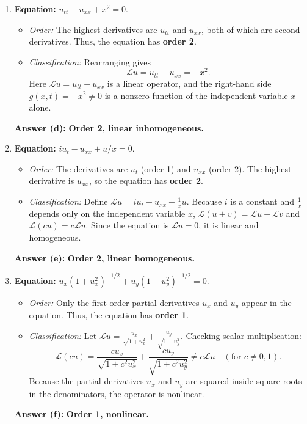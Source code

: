 \documentclass[11pt,a4paper]{article}
\begin{document}
\begin{enumerate}[label=(\alph*)]
    \item \textbf{Equation:} $u_{tt} - u_{xx} + x^2 = 0$.
    \begin{itemize}
        \item \emph{Order:} The highest derivatives are $u_{tt}$ and $u_{xx}$, both of which are second derivatives. Thus, the equation has \textbf{order 2}.
        \item \emph{Classification:} Rearranging gives
        \[
            \mathcal{L}u = u_{tt} - u_{xx} = -x^2.
        \]
        Here $\mathcal{L}u = u_{tt} - u_{xx}$ is a linear operator, and the right-hand side $g(x, t) = -x^2 \neq 0$ is a nonzero function of the independent variable $x$ alone.
    \end{itemize}
    \textbf{Answer (d):} \textbf{Order 2, linear inhomogeneous.}

    \item \textbf{Equation:} $i u_t - u_{xx} + u/x = 0$.
    \begin{itemize}
        \item \emph{Order:} The derivatives are $u_t$ (order 1) and $u_{xx}$ (order 2). The highest derivative is $u_{xx}$, so the equation has \textbf{order 2}.
        \item \emph{Classification:} Define $\mathcal{L}u = i u_t - u_{xx} + \frac{1}{x}u$. Because $i$ is a constant and $\frac{1}{x}$ depends only on the independent variable $x$, $\mathcal{L}(u+v) = \mathcal{L}u + \mathcal{L}v$ and $\mathcal{L}(cu) = c\mathcal{L}u$. Since the equation is $\mathcal{L}u = 0$, it is linear and homogeneous.
    \end{itemize}
    \textbf{Answer (e):} \textbf{Order 2, linear homogeneous.}

    \item \textbf{Equation:} $u_x(1 + u_x^2)^{-1/2} + u_y(1 + u_y^2)^{-1/2} = 0$.
    \begin{itemize}
        \item \emph{Order:} Only the first-order partial derivatives $u_x$ and $u_y$ appear in the equation. Thus, the equation has \textbf{order 1}.
        \item \emph{Classification:} Let $\mathcal{L}u = \frac{u_x}{\sqrt{1 + u_x^2}} + \frac{u_y}{\sqrt{1 + u_y^2}}$. Checking scalar multiplication:
        \[
            \mathcal{L}(cu) = \frac{c u_x}{\sqrt{1 + c^2 u_x^2}} + \frac{c u_y}{\sqrt{1 + c^2 u_y^2}} \neq c\mathcal{L}u \quad (\text{for } c \neq 0, 1).
        \]
        Because the partial derivatives $u_x$ and $u_y$ are squared inside square roots in the denominators, the operator is nonlinear.
    \end{itemize}
    \textbf{Answer (f):} \textbf{Order 1, nonlinear.}


\end{enumerate}
\end{document}

